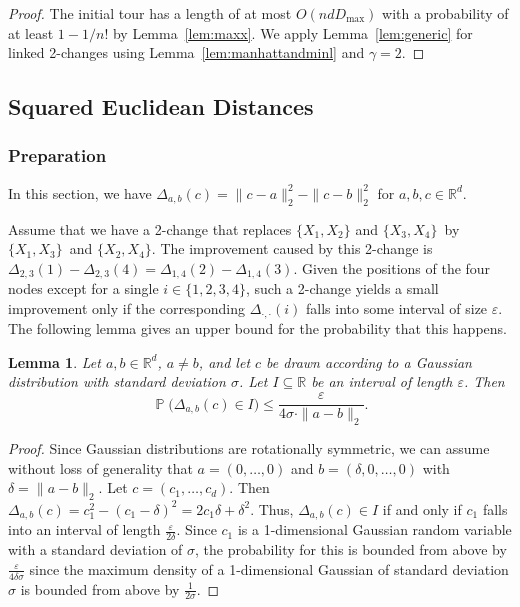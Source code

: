 \documentclass[11pt,DIV=12,a4paper]{scrartcl}
\newtheorem{lemma}[claim]{Lemma}
\newcommand{\edge}[2]{\ensuremath{\{X_{#1}, X_{#2}\}}}
\newcommand{\real}{\ensuremath{\mathbb{R}}}
\newcommand{\eps}{\varepsilon}
\newcommand{\maxx}{D_{\max}}
\DeclareMathOperator{\probab}{\mathbb{P}}
\begin{document}
\begin{proof}
The initial tour has a length of at most $O(nd\maxx)$ with a probability of at least $1-1/n!$
by Lemma~\ref{lem:maxx}.
We apply Lemma~\ref{lem:generic} for linked 2-changes using Lemma~\ref{lem:manhattandminl} and $\gamma = 2$.
\end{proof}


\subsection{Squared Euclidean Distances}
\label{sec:sed}

\subsubsection{Preparation}

In this section, we have $\Delta_{a,b}(c) = \|c-a\|^2_2 - \|c-b\|^2_2$
for $a, b, c \in \real^d$.

Assume that we have a 2-change that replaces $\edge 12$ and \edge 34\ by \edge 13\ and \edge 24.
The improvement caused by this 2-change is $\Delta_{2,3}(1) - \Delta_{2,3}(4) = \Delta_{1,4}(2) - \Delta_{1,4}(3)$.
Given the positions of the four nodes except for a single $i \in \{1,2,3,4\}$, such a 2-change yields a small improvement only if 
the corresponding $\Delta_{\cdot, \cdot}(i)$ falls into some interval of size $\eps$.
The following lemma gives an upper bound for the probability that this happens.

\begin{lemma}
\label{lem:seddelta}
Let $a, b \in \real^d$, $a \neq b$, and let $c$ be drawn according to a Gaussian
distribution with standard deviation $\sigma$. Let $I \subseteq \real$
be an interval of length $\eps$.
Then
\[
  \probab\bigl(\Delta_{a,b}(c) \in I\big) \leq \frac{\eps}{4 \sigma \cdot \|a-b\|_2}.
\]
\end{lemma}

\begin{proof}
Since Gaussian distributions are rotationally symmetric, we can assume without
loss of generality that $a = (0,\ldots, 0)$
and $b = (\delta, 0, \ldots, 0)$ with $\delta = \|a-b\|_2$.
Let $c = (c_1, \ldots, c_d)$. Then $\Delta_{a,b}(c) = c_1^2 - (c_1 - \delta)^2 = 2c_1\delta + \delta^2$.
Thus, $\Delta_{a,b}(c) \in I$ if and only
if $c_1$ falls into an interval of length $\frac\eps{2\delta}$.
Since $c_1$ is a 1-dimensional Gaussian random variable with a standard deviation
of $\sigma$, the probability for this is bounded from above
by $\frac{\eps}{4 \delta \sigma}$ since the maximum density of a 1-dimensional Gaussian of standard deviation $\sigma$ is
bounded from above by $\frac 1{2\sigma}$.
\end{proof}
\end{document}
